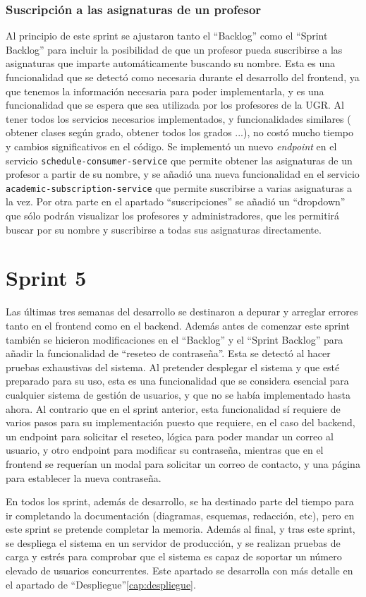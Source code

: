 \subsubsection{Suscripción a las asignaturas de un profesor}
Al principio de este sprint se ajustaron tanto el ``Backlog'' como el ``Sprint Backlog'' para incluir la posibilidad de que un profesor pueda suscribirse a las asignaturas que imparte automáticamente buscando su nombre. Esta es una funcionalidad que se detectó como necesaria durante el desarrollo del frontend, ya que tenemos la información necesaria para poder implementarla, y es una funcionalidad que se espera que sea utilizada por los profesores de la UGR.
\newline
Al tener todos los servicios necesarios implementados, y funcionalidades similares ( obtener clases según grado, obtener todos los grados ...), no costó mucho tiempo y cambios significativos en el código. Se implementó un nuevo \textit{endpoint} en el servicio \texttt{schedule-consumer-service} que permite obtener las asignaturas de un profesor a partir de su nombre, y se añadió una nueva funcionalidad en el servicio \texttt{academic-subscription-service} que permite suscribirse a varias asignaturas a la vez.
Por otra parte en el apartado ``suscripciones'' se añadió un ``dropdown'' que sólo podrán visualizar los profesores y administradores, que les permitirá buscar por su nombre y suscribirse a todas sus asignaturas directamente.

\section{Sprint 5}

Las últimas tres semanas del desarrollo se destinaron a depurar y arreglar errores tanto en el frontend como en el backend. Además antes de comenzar este sprint también se hicieron modificaciones en el ``Backlog'' y el ``Sprint Backlog'' para añadir la funcionalidad de ``reseteo de contraseña''. Esta se detectó al hacer pruebas exhaustivas del sistema. Al pretender desplegar el sistema y que esté preparado para su uso, esta es una funcionalidad que se considera esencial para cualquier sistema de gestión de usuarios, y que no se había implementado hasta ahora.
\newline
Al contrario que en el sprint anterior, esta funcionalidad sí requiere de varios pasos para su implementación puesto que requiere, en el caso del backend, un endpoint para solicitar el reseteo, lógica para poder mandar un correo al usuario, y otro endpoint para modificar su contraseña, mientras que en el frontend se requerían un modal para solicitar un correo de contacto, y una página para establecer la nueva contraseña.

En todos los sprint, además de desarrollo, se ha destinado parte del tiempo para ir completando la documentación (diagramas, esquemas, redacción, etc), pero en este sprint se pretende completar la memoria.
\newline
Además al final, y tras este sprint, se despliega el sistema en un servidor de producción, y se realizan pruebas de carga y estrés para comprobar que el sistema es capaz de soportar un número elevado de usuarios concurrentes. Este apartado se desarrolla con más detalle en el apartado de ``Despliegue''\ref{cap:despliegue}.
